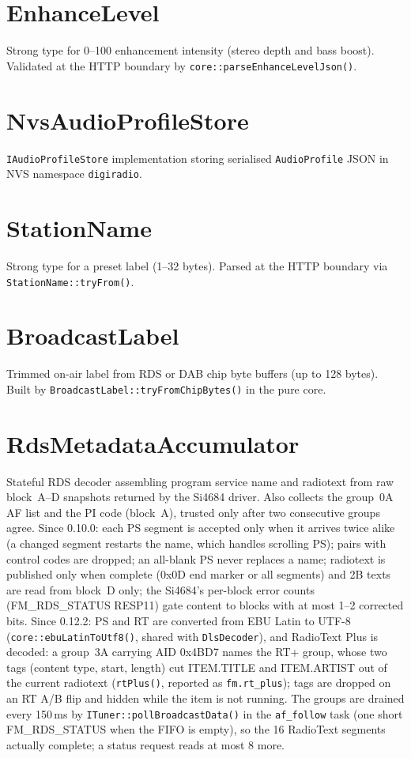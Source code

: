 \section{EnhanceLevel}\label{cls:EnhanceLevel}
Strong type for 0--100 enhancement intensity (stereo depth and bass boost).
Validated at the HTTP boundary by \texttt{core::parseEnhanceLevelJson()}.

\section{NvsAudioProfileStore}\label{cls:NvsAudioProfileStore}
\texttt{IAudioProfileStore} implementation storing serialised
\texttt{AudioProfile} JSON in NVS namespace \texttt{digiradio}.

\section{StationName}\label{cls:StationName}
Strong type for a preset label (1--32 bytes). Parsed at the HTTP boundary
via \texttt{StationName::tryFrom()}.

\section{BroadcastLabel}\label{cls:BroadcastLabel}
Trimmed on-air label from RDS or DAB chip byte buffers (up to 128 bytes).
Built by \texttt{BroadcastLabel::tryFromChipBytes()} in the pure core.

\section{RdsMetadataAccumulator}\label{cls:RdsMetadataAccumulator}
Stateful RDS decoder assembling program service name and radiotext from
raw block~A--D snapshots returned by the Si4684 driver. Also collects the
group~0A AF list and the PI code (block~A), trusted only after two
consecutive groups agree. Since 0.10.0: each PS segment is accepted only
when it arrives twice alike (a changed segment restarts the name, which
handles scrolling PS); pairs with control codes are dropped; an all-blank
PS never replaces a name; radiotext is published only when complete (0x0D
end marker or all segments) and 2B texts are read from block~D only; the
Si4684's per-block error counts (FM\_RDS\_STATUS RESP11) gate content to
blocks with at most 1--2 corrected bits. Since 0.12.2: PS and RT are
converted from EBU Latin to UTF-8 (\texttt{core::ebuLatinToUtf8()}, shared
with \texttt{DlsDecoder}), and RadioText Plus is decoded: a group~3A
carrying AID 0x4BD7 names the RT+ group, whose two tags (content type,
start, length) cut ITEM.TITLE and ITEM.ARTIST out of the current
radiotext (\texttt{rtPlus()}, reported as \texttt{fm.rt\_plus}); tags
are dropped on an RT A/B flip and hidden while the item is not running.
The groups are drained every 150\,ms by \texttt{ITuner::pollBroadcastData()}
in the \texttt{af\_follow} task (one short FM\_RDS\_STATUS when the FIFO
is empty), so the 16 RadioText segments actually complete; a status
request reads at most 8 more.

